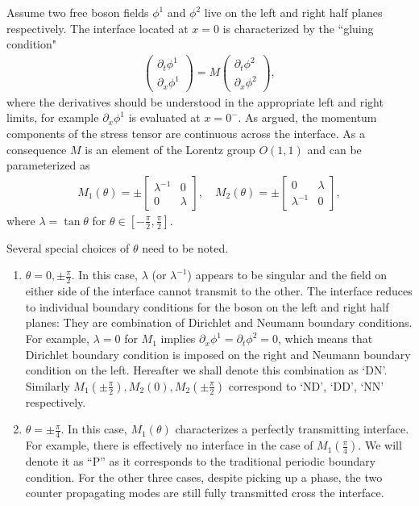 Assume two free boson fields $\phi^1$ and $\phi^2$ live on the left and right half planes respectively. The interface located at $x = 0$ is characterized by the ``gluing condition"
\begin{equation}\begin{aligned}
\label{eq:def_M}
\begin{pmatrix}
\partial_t\phi^1\\
\partial_x\phi^1
\end{pmatrix}
=M\begin{pmatrix}
\partial_t\phi^2\\
\partial_x\phi^2
\end{pmatrix},
\end{aligned}\end{equation}
where the derivatives should be understood in the appropriate left and right limits, for example $\partial_x \phi^1$ is evaluated at $ x = 0^-$. As argued, the momentum components of the stress tensor are continuous across the interface. As a consequence $M$ is an element of the Lorentz group $O(1,1)$ and can be parameterized as
\begin{equation}\begin{aligned}
\label{eq:M1M2}
M_1(\theta)=\pm
\begin{bmatrix}
\lambda^{-1} & 0 \\
0 & \lambda
\end{bmatrix},\quad
M_2(\theta)=\pm
\begin{bmatrix}
0 & \lambda  \\
\lambda^{-1} & 0 
\end{bmatrix},
\end{aligned}\end{equation}
where $\lambda=\tan\theta$ for $\theta\in\left[-\frac{\pi}{2},\frac{\pi}{2}\right]$. 

Several special choices of $\theta$ need to be noted. 
\begin{enumerate}
\item $\theta=0,\pm \frac{\pi}{2}$. In this case, $\lambda$ (or $\lambda^{-1}$) appears to be singular and the field on either side of the interface cannot transmit to the other. The interface reduces to individual boundary conditions for the boson on the left and right half planes: They are combination of Dirichlet and Neumann boundary conditions. For example, $\lambda = 0$ for $M_1$ implies $\partial_x\phi^1 = \partial_t\phi^2 =0$, which means that Dirichlet boundary condition is imposed on the right and Neumann boundary condition on the left. Hereafter we shall denote this combination as `DN'. Similarly $M_1(\pm\frac{\pi}{2}),M_2(0),M_2(\pm \frac{\pi}{2})$ correspond to `ND', `DD', `NN' respectively. 
\item $\theta = \pm \frac{\pi}{4}$. In this case, $M_1(\theta)$ characterizes a perfectly transmitting interface. For example, there is effectively no interface in the case of $M_1( \frac{\pi}{4})$. We will denote it as ``P'' as it corresponds to the traditional periodic boundary condition. For the other three cases, despite picking up a phase, the two counter propagating modes are still fully transmitted cross the interface. 
\end{enumerate}

